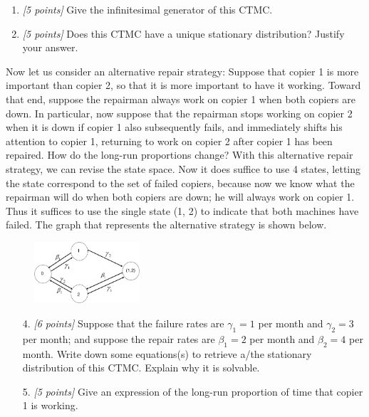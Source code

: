 \documentclass[article,12pt,a4paper]{article}
\begin{document}
	\begin{enumerate}
		\vspace{-.1cm}
		\item \textit{[5 points]} Give the infinitesimal generator of this CTMC.
		\item \textit{[5 points]} Does this CTMC have a unique stationary distribution? Justify your answer.
	\end{enumerate}
	Now let us consider an alternative repair strategy: Suppose that copier 1 is more
	important than copier 2, so that it is more important to have it working. Toward that end,
	suppose the repairman always work on copier 1 when both copiers are down. In particular,
	now suppose that the repairman stops working on copier 2 when it is down if copier 1 also
	subsequently fails, and immediately shifts his attention to copier 1, returning to work on copier
	2 after copier 1 has been repaired. How do the long-run proportions change?
	With this alternative repair strategy, we can revise the state space. Now it does suffice to
	use 4 states, letting the state correspond to the set of failed copiers, because now we know
	what the repairman will do when both copiers are down; he will always work on copier 1. Thus
	it suffices to use the single state (1, 2) to indicate that both machines have failed.  The graph that represents the alternative strategy is shown below.
	\vspace{-.2cm}
	\begin{figure}[h]
		\centering
		\includegraphics[width=0.35\textwidth]{ctmc_2.png} 
	\end{figure}
	\begin{enumerate}
		\vspace{-.5cm}
		\item[4.] \textit{[6 points]} Suppose that the failure rates are $\gamma_1 = 1$ per month and $\gamma_2 = 3$ per month; and suppose the repair rates are $\beta_1 = 2$ per month and $\beta_2 = 4$ per month.
		Write down some equations(s) to retrieve a/the stationary distribution of this CTMC. Explain why it is solvable.
		\item[5.] \textit{[5 points]} Give an expression of the long-run proportion of time that copier 1 is working.
	\end{enumerate}
	
\end{document}
